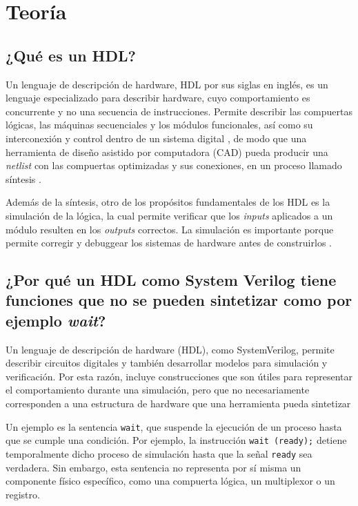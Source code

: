 \documentclass[12pt,letterpaper]{article}
\begin{document}
\section{Teoría}


\subsection{¿Qué es un HDL?}

Un lenguaje de descripción de hardware, HDL por sus siglas en inglés, es un lenguaje especializado para describir hardware, cuyo comportamiento es concurrente y no una secuencia de instrucciones. Permite describir las compuertas lógicas, las máquinas secuenciales y los módulos funcionales, así como su interconexión y control dentro de un sistema digital \cite{lipovski1977}, de modo que una herramienta de diseño asistido por computadora (CAD) pueda producir una \textit{netlist} con las compuertas optimizadas y sus conexiones, en un proceso llamado síntesis \cite{harris2007}. 

Además de la síntesis, otro de los propósitos fundamentales de los HDL es la simulación de la lógica, la cual permite verificar que los \textit{inputs} aplicados a un módulo resulten en los \textit{outputs} correctos. La simulación es importante porque permite corregir y debuggear los sistemas de hardware antes de construirlos \cite{harris2007}. 

\subsection{¿Por qué un HDL como System Verilog tiene funciones que no se pueden sintetizar como por ejemplo \textit{wait}?}

Un lenguaje de descripción de hardware (HDL), como SystemVerilog,
permite describir circuitos digitales y también desarrollar
modelos para simulación y verificación. Por esta razón, incluye
construcciones que son útiles para representar el comportamiento
durante una simulación, pero que no necesariamente corresponden
a una estructura de hardware que una herramienta pueda sintetizar
\cite{ieee2024systemverilog}

Un ejemplo es la sentencia \texttt{wait}, que suspende la
ejecución de un proceso hasta que se cumple una condición.
Por ejemplo, la instrucción \texttt{wait (ready);} detiene
temporalmente dicho proceso de simulación hasta que la señal
\texttt{ready} sea verdadera. Sin embargo, esta sentencia no
representa por sí misma un componente físico específico, como
una compuerta lógica, un multiplexor o un registro.
\end{document}
